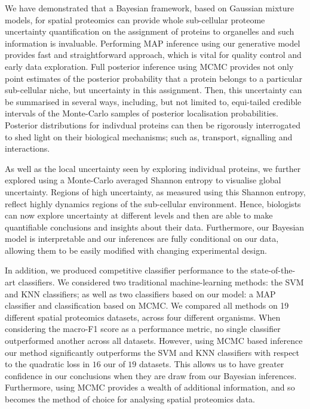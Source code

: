 \documentclass[12pt,english]{article}\usepackage[]{graphicx}\usepackage[]{color}
\begin{document}
We have demonstrated that a Bayesian framework, based on Gaussian
mixture models, for spatial proteomics can provide whole sub-cellular
proteome uncertainty quantification on the assignment of proteins to
organelles and such information is invaluable. Performing MAP
inference using our generative model provides fast and straightforward
approach, which is vital for quality control and early data
exploration. Full posterior inference using MCMC provides not only
point estimates of the posterior probability that a protein belongs to
a particular sub-cellular niche, but uncertainty in this
assignment. Then, this uncertainty can be summarised in several ways,
including, but not limited to, equi-tailed credible intervals of the
Monte-Carlo samples of posterior localisation probabilities.
Posterior distributions for indivdual proteins can then be rigorously
interrogated to shed light on their biological mechanisms; such as,
transport, signalling and interactions.

As well as the local uncertainty seen by exploring individual
proteins, we further explored using a Monte-Carlo averaged Shannon
entropy to visualise global uncertainty. Regions of high uncertainty,
as measured using this Shannon entropy, reflect highly dynamics
regions of the sub-cellular environment.  Hence, biologists can now
explore uncertainty at different levels and then are able to make
quantifiable conclusions and insights about their data.  Furthermore,
our Bayesian model is interpretable and our inferences are fully
conditional on our data, allowing them to be easily modified with
changing experimental design.

In addition, we produced competitive classifier performance to the
state-of-the-art classifiers. We considered two traditional
machine-learning methods: the SVM and KNN classifiers; as well as two
classifiers based on our model: a MAP classifier and classification
based on MCMC. We compared all methods on 19 different spatial
proteomics datasets, across four different organisms. When considering
the macro-F1 score as a performance metric, no single classifier
outperformed another across all datasets. However, using MCMC based
inference our method significantly outperforms the SVM and KNN
classifiers with respect to the quadratic loss in $16$ our of $19$
datasets. This allows us to have greater confidence in our conclusions
when they are draw from our Bayesian inferences. Furthermore, using
MCMC provides a wealth of additional information, and so becomes the
method of choice for analysing spatial proteomics data.
\end{document}
